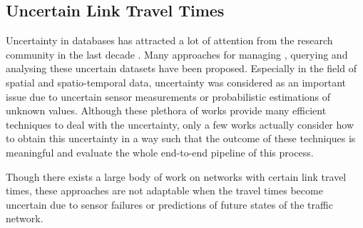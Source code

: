 
\subsection{Uncertain Link Travel Times}
\label{subsec:ult}
Uncertainty in databases has attracted a lot of attention from the research
community in the last decade . Many approaches for managing
\cite{Agrawal06,Antova08,Jampani08}, querying
\cite{Soliman07,Li11} and analysing \cite{Chui07,Chau06}
these uncertain datasets have been proposed.
Especially in the field of spatial \cite{Cheng04,Dai05} and
spatio-temporal \cite{Emrich12,Niedermayer13} data, uncertainty was considered
as an important issue due to uncertain sensor measurements or
probabilistic estimations of unknown values. Although these plethora of works
provide many efficient techniques to deal with the uncertainty, only a few works
actually consider how to obtain this uncertainty in a way such that the outcome
of these techniques is meaningful and evaluate the whole end-to-end pipeline of
this process.

Though there exists a large body of work on networks with certain link travel
times, these approaches are not adaptable when the travel times become
uncertain due to sensor failures or predictions of future states of the traffic
network.

